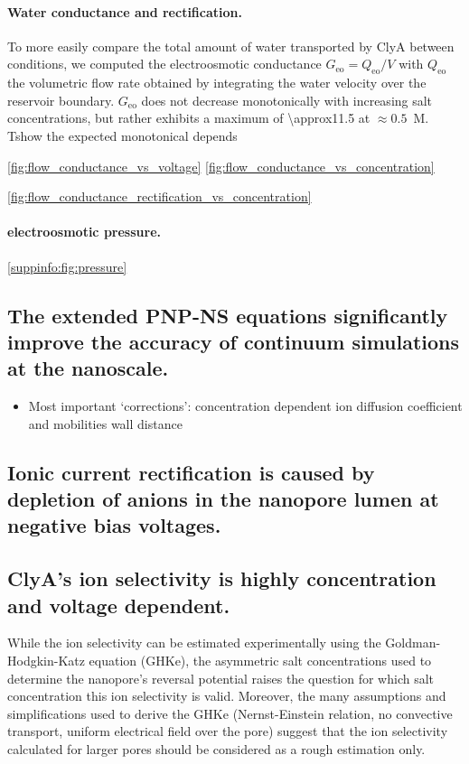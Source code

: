 \documentclass[journal=ancac3,manuscript=article,etalmode=truncate,maxauthors=0,layout=onecolumn]{achemso}
\begin{document}
\paragraph{Water conductance and rectification.}
%
To more easily compare the total amount of water transported by ClyA between
conditions, we computed the electroosmotic conductance $G_{\text{eo}} =
Q_{\text{eo}}/V$ with $Q_{\text{eo}}$ the volumetric flow rate obtained by
integrating the water velocity over the reservoir boundary.  $G_{\text{eo}}$ does not decrease monotonically with increasing salt
concentrations, but rather exhibits a maximum of \SI{\approx11.5}{\cnmpnspv} at
$\approx0.5$~M. Tshow the expected monotonical depends

\cite{Mao-2014,Laohakunakorn-2015}



\cref{fig:flow_conductance_vs_voltage}
\cref{fig:flow_conductance_vs_concentration}


\cref{fig:flow_conductance_rectification_vs_concentration}

\paragraph{electroosmotic pressure.}
\cref{suppinfo:fig:pressure}
\cite{Hoogerheide-2014}


\subsection{The extended PNP-NS equations significantly improve the accuracy of continuum simulations at the
nanoscale.}

\begin{itemize}
  \item Most important `corrections':
  \subitem concentration dependent ion diffusion coefficient and mobilities
  \subitem wall distance
\end{itemize}

\subsection{Ionic current rectification is caused by depletion of anions in the nanopore lumen at negative
bias voltages.}

\subsection{ClyA's ion selectivity is highly concentration and voltage dependent.}
While the ion selectivity can be estimated experimentally using the Goldman-Hodgkin-Katz
equation (GHKe),\cite{Franceschini-2016,Huang-2017} the asymmetric salt concentrations used to determine the
nanopore's reversal potential raises the question for which salt concentration this ion selectivity is valid.
Moreover, the many assumptions and simplifications used to derive the GHKe (Nernst-Einstein relation, no
convective transport, uniform electrical field over the pore) suggest that the ion selectivity calculated for
larger pores should be considered as a rough estimation only.
\end{document}
